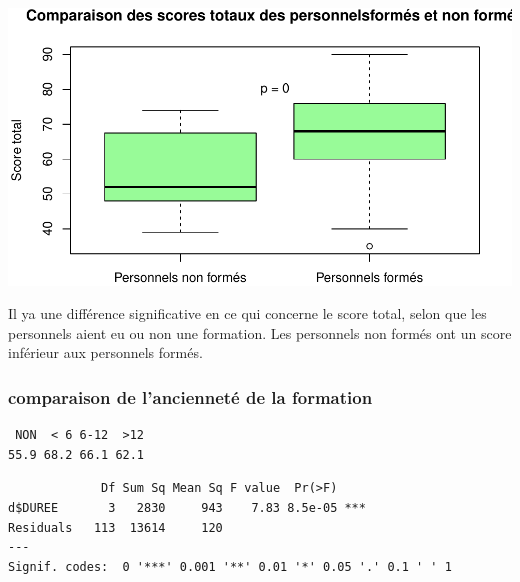 \documentclass[]{article}
\newenvironment{Shaded}{\begin{snugshade}}{\end{snugshade}}
\newcommand{\KeywordTok}[1]{\textcolor[rgb]{0.13,0.29,0.53}{\textbf{{#1}}}}
\newcommand{\DataTypeTok}[1]{\textcolor[rgb]{0.13,0.29,0.53}{{#1}}}
\newcommand{\DecValTok}[1]{\textcolor[rgb]{0.00,0.00,0.81}{{#1}}}
\newcommand{\FloatTok}[1]{\textcolor[rgb]{0.00,0.00,0.81}{{#1}}}
\newcommand{\StringTok}[1]{\textcolor[rgb]{0.31,0.60,0.02}{{#1}}}
\newcommand{\NormalTok}[1]{{#1}}
\begin{document}
\begin{Shaded}
\end{Shaded}

\includegraphics{analyse_files/figure-latex/unnamed-chunk-12-1.pdf}

Il ya une différence significative en ce qui concerne le score total,
selon que les personnels aient eu ou non une formation. Les personnels
non formés ont un score inférieur aux personnels formés.

\subsubsection{comparaison de l'ancienneté de la
formation}\label{comparaison-de-lanciennete-de-la-formation}

\begin{verbatim}
 NON  < 6 6-12  >12 
55.9 68.2 66.1 62.1 
\end{verbatim}

\begin{verbatim}
             Df Sum Sq Mean Sq F value  Pr(>F)    
d$DUREE       3   2830     943    7.83 8.5e-05 ***
Residuals   113  13614     120                    
---
Signif. codes:  0 '***' 0.001 '**' 0.01 '*' 0.05 '.' 0.1 ' ' 1
\end{verbatim}
\end{document}
